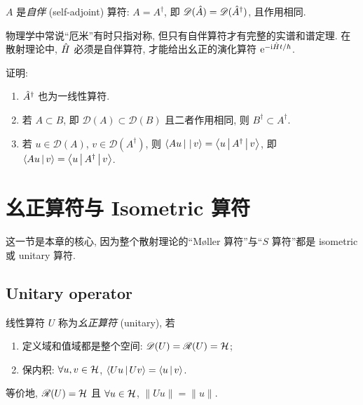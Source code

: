 \begin{definition}[自伴/厄米算符]
$A$ 是\emph{自伴} (self-adjoint) 算符: $A=A^{\dagger}$, 即 $\mathscr D(\hat{A})=\mathscr D(\hat{A}^{\dagger})$, 且作用相同.
\end{definition}

\begin{remark}
物理学中常说``厄米''有时只指对称, 但只有自伴算符才有完整的实谱和谱定理. 在散射理论中, $\hat{H}$ 必须是自伴算符, 才能给出幺正的演化算符 $\mathrm{e}^{-\mathrm{i}\hat{H} t/\hbar}$.
\end{remark}

\begin{remark}[作业 2]
证明:
\begin{enumerate}
    \item $\hat{A}^{\dagger}$ 也为一线性算符.
    \item 若 $A\subset B$, 即 $\mathscr D(A)\subset\mathscr D(B)$ 且二者作用相同, 则 $B^{\dagger}\subset A^{\dagger}$.
    \item 若 $u\in\mathscr D(A)$, $v\in\mathscr D(A^{\dagger})$, 则 $\left\langle Au \,\middle|\,  \,\middle|\, v \right\rangle=\left\langle u \,\middle|\, A^{\dagger} \,\middle|\, v \right\rangle$, 即 $\left\langle Au \,\middle|\, v \right\rangle=\left\langle u \,\middle|\, A^{\dagger} \,\middle|\, v \right\rangle$.
\end{enumerate}
\end{remark}

\section{幺正算符与 Isometric 算符}\label{sec:unitary-isometric}

这一节是本章的核心, 因为整个散射理论的``M\o ller 算符''与``$S$ 算符''都是 isometric 或 unitary 算符.

\subsection{Unitary operator}\label{subsec:unitary}

\begin{definition}[幺正算符]
线性算符 $U$ 称为\emph{幺正算符} (unitary), 若
\begin{enumerate}
    \item 定义域和值域都是整个空间: $\mathscr D(U)=\mathscr R(U)=\mathcal{H}$;
    \item 保内积: $\forall u,v\in\mathcal{H}$, $\left\langle Uu \,\middle|\, Uv \right\rangle=\left\langle u \,\middle|\, v \right\rangle$.
\end{enumerate}
等价地, $\mathscr R(U)=\mathcal{H}$ 且 $\forall u\in\mathcal{H}$, $\|Uu\|=\|u\|$.
\end{definition}

